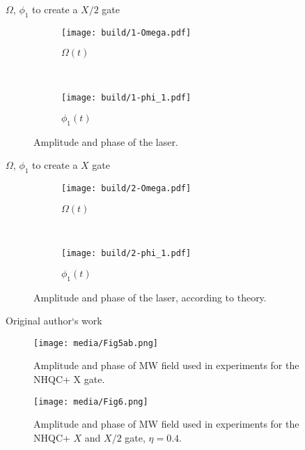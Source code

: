 \documentclass[aspectratio=1610, 9pt]{beamer}
\begin{document}
\begin{frame}{$\Omega$, $\phi_1$ to create a $X/2$ gate}
  \begin{figure}
    \centering
    \begin{subfigure}[b]{0.45\textwidth}
      \centering
      \texttt{[image: build/1-Omega.pdf]}
      \caption{$\Omega(t)$}
      \label{fig:1-Omega}
    \end{subfigure}
    \,
    \begin{subfigure}[b]{0.45\textwidth}
      \centering
      \texttt{[image: build/1-phi\_1.pdf]}
      \caption{$\phi_1(t)$}
      \label{fig:1-phi_1}
    \end{subfigure}
    \caption{Amplitude and phase of the laser.}
  \end{figure}
\end{frame}

\begin{frame}{$\Omega$, $\phi_1$ to create a $X$ gate}
  \begin{figure}
    \centering
    \begin{subfigure}[b]{0.45\textwidth}
      \centering
      \texttt{[image: build/2-Omega.pdf]}
      \caption{$\Omega(t)$}
      \label{fig:1-Omega}
    \end{subfigure}
    \,
    \begin{subfigure}[b]{0.45\textwidth}
      \centering
      \texttt{[image: build/2-phi\_1.pdf]}
      \caption{$\phi_1(t)$}
      \label{fig:1-phi_1}
    \end{subfigure}
    \caption{Amplitude and phase of the laser, according to theory.}
  \end{figure}
\end{frame}

\begin{frame}{Original author`s work}
  \begin{figure}
    \centering
      \texttt{[image: media/Fig5ab.png]}
      \caption{Amplitude and phase of MW field used in experiments for the NHQC+ X gate.}
  \end{figure}
  \begin{figure}
    \centering
      \texttt{[image: media/Fig6.png]}
      \caption{Amplitude and phase of MW field used in experiments for the NHQC+ $X$ and $X/2$ gate,
      $\eta = 0.4$.}
  \end{figure}
\end{frame}
\end{document}
